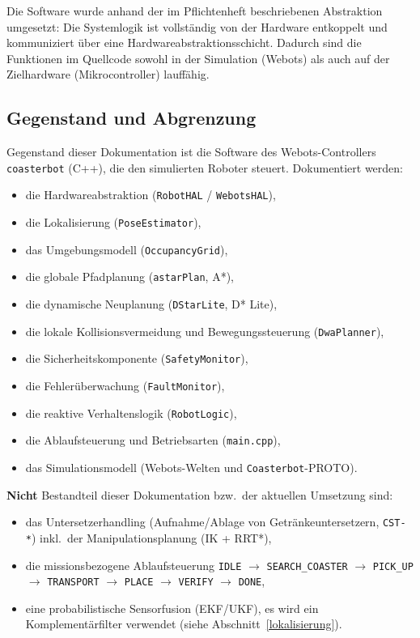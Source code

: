 \documentclass[
  a4paper,
  12pt,
  DIV=12,        %
  parskip=half,  %
  headings=small %
]{scrartcl}
\theoremstyle{definition}
\providecommand{\tightlist}{%
  \setlength{\itemsep}{0pt}\setlength{\parskip}{0pt}}
\theoremstyle{definition}
\begin{document}
Die Software wurde anhand der im Pflichtenheft beschriebenen
Abstraktion umgesetzt: Die Systemlogik ist vollständig von
der Hardware entkoppelt und kommuniziert über
eine Hardwareabstraktionsschicht. Dadurch sind die Funktionen im Quellcode sowohl
in der Simulation (Webots) als auch auf der Zielhardware (Mikrocontroller)
lauffähig.

\subsection{Gegenstand und Abgrenzung}\label{gegenstand-und-abgrenzung}

Gegenstand dieser Dokumentation ist die Software des
Webots-Controllers \texttt{coasterbot} (C++), die den simulierten
Roboter steuert. Dokumentiert werden:

\begin{itemize}
\tightlist
\item
  die Hardwareabstraktion (\texttt{RobotHAL} / \texttt{WebotsHAL}),
\item
  die Lokalisierung (\texttt{PoseEstimator}),
\item
  das Umgebungsmodell (\texttt{OccupancyGrid}),
\item
  die globale Pfadplanung (\texttt{astarPlan}, A*),
\item
  die dynamische Neuplanung (\texttt{DStarLite}, D* Lite),
\item
  die lokale Kollisionsvermeidung und Bewegungssteuerung
  (\texttt{DwaPlanner}),
\item
  die Sicherheitskomponente (\texttt{SafetyMonitor}),
\item
  die Fehlerüberwachung (\texttt{FaultMonitor}),
\item
  die reaktive Verhaltenslogik (\texttt{RobotLogic}),
\item
  die Ablaufsteuerung und Betriebsarten (\texttt{main.cpp}),
\item
  das Simulationsmodell (Webots-Welten und \texttt{Coasterbot}-PROTO).
\end{itemize}

\textbf{Nicht} Bestandteil dieser Dokumentation bzw.\ der aktuellen
Umsetzung sind:

\begin{itemize}
\tightlist
\item
  das Untersetzerhandling (Aufnahme/Ablage von Getränkeuntersetzern,
  \texttt{CST-*}) inkl.\ der Manipulationsplanung (IK + RRT*),
\item
  die missionsbezogene Ablaufsteuerung \texttt{IDLE} $\to$
  \texttt{SEARCH\_COASTER} $\to$ \texttt{PICK\_UP} $\to$ \texttt{TRANSPORT}
  $\to$ \texttt{PLACE} $\to$ \texttt{VERIFY} $\to$ \texttt{DONE},
\item
  eine probabilistische Sensorfusion (EKF/UKF), es wird ein
  Komplementärfilter verwendet (siehe Abschnitt~\ref{lokalisierung}).
\end{itemize}
\end{document}
